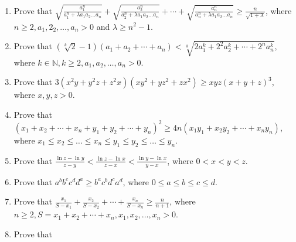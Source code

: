 \begin{enumerate}
\item Prove that $\sqrt{\frac{a_1^n}{a_1^n + \lambda a_1a_2\ldots a_n}} + \sqrt{\frac{a_2^n}{a_2^n + \lambda a_1a_2\ldots a_n}} +
  \cdots + \sqrt{\frac{a_n^n}{a_n^n + \lambda a_1a_2\ldots a_n}}\geq \frac{n}{\sqrt{1 + \lambda}}$, where $n\geq 2, a_1, 2_2,
  \ldots, a_n > 0$ and $\lambda \geq n^2 - 1$.
\item Prove that $\left(\sqrt[k]{2} - 1\right)(a_1 + a_2 + \cdots + a_n) < \sqrt[k]{2a_1^k + 2^2a_2^k + \cdots + 2^na_n^k}$, where
  $k\in\mathbb{N}, k\geq 2, a_1, a_2, \ldots, a_n > 0$.
\item Prove that $3(x^2y + y^2z + z^2x)(xy^2 + yz^2 + zx^2)\geq xyz(x + y + z)^3$, where $x, y, z > 0$.
\item Prove that $(x_1 + x_2 + \cdots + x_n + y_1 + y_2 + \cdots + y_n)^2 \geq 4n(x_1y_1 + x_2y_2 + \cdots + x_ny_n)$, where
  $x_1\leq x_2\leq\ldots\leq x_n\leq y_1\leq y_2\leq\ldots\leq y_n$.
\item Prove that $\frac{\ln z - \ln y}{z - y} < \frac{\ln z - \ln x}{z - x} < \frac{\ln y - \ln x}{y - x}$, where $0 < x < y < z$.
\item Prove that $a^bb^cc^dd^a\geq b^ac^bd^ca^d$, where $0\leq a\leq b\leq c\leq d$.
\item Prove that $\frac{x_1}{S - x_1} + \frac{x_2}{S - x_2} + \cdots + \frac{x_n}{S - x_n}\geq \frac{n}{n + 1}$, where $n\geq 2, S
  = x_1 + x_2 + \cdots + x_n, x_1, x_2, \ldots, x_n > 0$.
\item Prove that
\end{enumerate}
